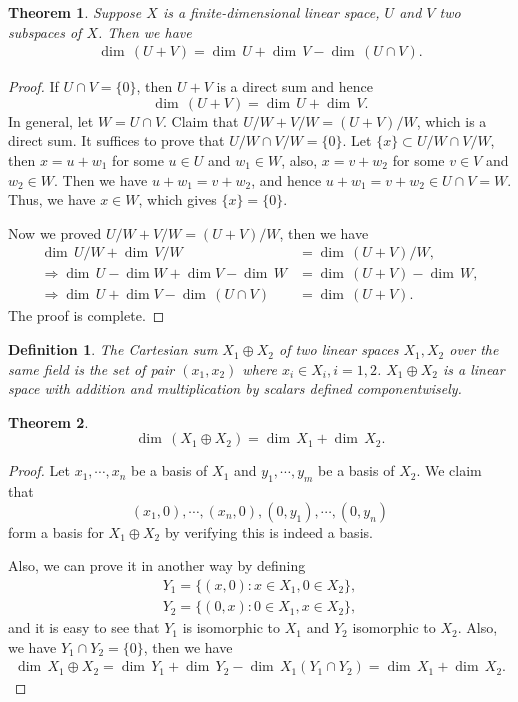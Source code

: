 \documentclass[11pt]{book}
\newtheorem{definition}{Definition}[chapter]
\newtheorem{theorem}{Theorem}[chapter]
\theoremstyle{definition}
\numberwithin{equation}{chapter}
\begin{document}
\medskip

\begin{theorem}
Suppose $X$ is a finite-dimensional linear space, $U$ and $V$ two subspaces of $X$. Then we have
\begin{align*}
     \dim \,(U+V) =  \dim \,U +  \dim \,V -  \dim \,(U\cap V).
\end{align*}
\end{theorem}
\begin{proof}
If $U\cap V = \{0\}$, then $U+V$ is a direct sum and hence 
$$ \dim \,(U+V) =  \dim \,U +  \dim \,V.$$
In general, let $W = U\cap V$. Claim that $U/W+V/W = (U+V)/W$, which is a direct sum. It suffices to prove that $U/W\cap V/W = \{0\}$. Let $\{x\}\subset U/W\cap V/W$, then $x = u+w_1$ for some $u\in U$ and $w_1\in W$, also, $x = v+w_2$ for some $v\in V$ and $w_2\in W$. Then we have $u+w_1 = v+w_2$, and hence $u+w_1 = v+w_2\in U\cap V = W$. Thus, we have $x\in W$, which gives $\{x\} = \{0\}$.

Now we proved $U/W+V/W = (U+V)/W$, then we have 
\begin{align*}
     \dim \,U/W +  \dim \,V/W & =  \dim \,(U+V)/W,\\
    \Rightarrow  \dim \,U -  \dim  W +  \dim  V -  \dim \,W & =  \dim \,(U+V) -  \dim \,W,\\ 
    \Rightarrow  \dim \,U +  \dim  V -  \dim \,(U\cap V) & =  \dim \,(U+V).
\end{align*}
The proof is complete.
\end{proof}

\medskip

\begin{definition}
The Cartesian sum $X_1\oplus X_2$ of two linear spaces $X_1, X_2$ over the same field is the set of pair $(x_1,x_2)$ where $x_i\in X_i, i = 1,2$. $X_1\oplus X_2$ is a linear space with addition and multiplication by scalars defined componentwisely. 
\end{definition}

\medskip

\begin{theorem}
$$ \dim \,(X_1\oplus X_2) =  \dim \,X_1 +  \dim \,X_2.$$
\end{theorem}
\begin{proof}
Let $x_1, \cdots, x_n$ be a basis of $X_1$ and $y_1, \cdots, y_m$ be a basis of $X_2$. We claim that 
$$(x_1,0),\cdots, (x_n,0), (0,y_1), \cdots, (0,y_n)$$ 
form a basis for $X_1\oplus X_2$ by verifying this is indeed a basis.

Also, we can prove it in another way by defining
\begin{align*}
    Y_1 = \{(x,0): x\in X_1, 0\in X_2\}, \\
    Y_2 = \{(0,x): 0\in X_1, x\in X_2\},
\end{align*}
and it is easy to see that $Y_1$ is isomorphic to $X_1$ and $Y_2$ isomorphic to $X_2$. Also, we have $Y_1\cap Y_2 = \{0\}$, then we have 
\begin{align*}
     \dim \,X_1\oplus X_2 =  \dim \,Y_1 +  \dim \,Y_2 -  \dim \,X_1(Y_1\cap Y_2) =  \dim \,X_1 +  \dim \,X_2.
\end{align*}
\end{proof}
\end{document}
